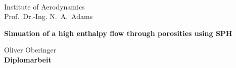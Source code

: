 


% 

\pagestyle{empty}

\begin{center}

\vspace*{-2.8cm}
\begin{minipage}[c]{.30\textwidth}
\end{minipage}
\begin{minipage}[c]{.43\textwidth}
    { ~\\ Institute of Aerodynamics \\ Prof.~Dr.-Ing. N.~A.~Adams}%
\end{minipage}
\begin{minipage}[c]{.25\textwidth}
\end{minipage}

\vspace*{3.3cm}
\begin{minipage}[c]{11cm}
{\LARGE\bf 
Simuation of a high enthalpy flow through porosities using SPH}
\end{minipage}

\vspace*{0.8cm}
Oliver Oberinger\\

\vspace*{2.8cm}
{\bfseries Diplomarbeit}


\end{center}
